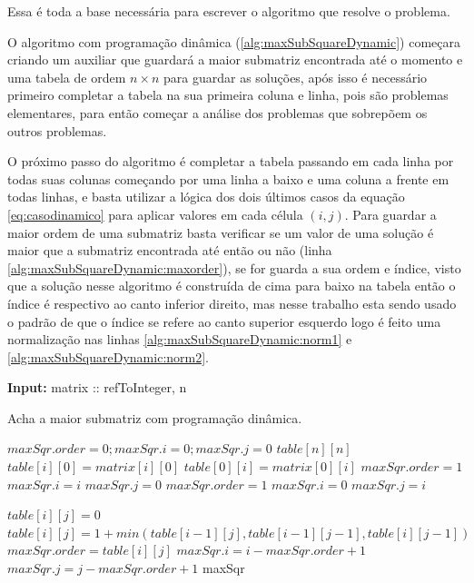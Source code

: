 \documentclass[10.9pt]{article}
\begin{document}
Essa é toda a base necessária para escrever o algoritmo que resolve o problema.

O algoritmo com programação dinâmica (\ref{alg:maxSubSquareDynamic}) começara criando um auxiliar que guardará a maior submatriz encontrada até o momento e uma tabela de ordem \(n\times n\) para guardar as soluções, após isso é necessário primeiro completar a tabela na sua primeira coluna e linha, pois são problemas elementares, para então começar a análise dos problemas que sobrepõem os outros problemas.

O próximo passo do algoritmo é completar a tabela passando em cada linha por todas suas colunas começando por uma linha a baixo e uma coluna a frente em todas linhas, e basta utilizar a lógica dos dois últimos casos da equação \eqref{eq:casodinamico} para aplicar valores em cada célula \((i,j)\). Para guardar a maior ordem de uma submatriz basta verificar se um valor de uma solução é maior que a submatriz encontrada até então ou não (linha \ref{alg:maxSubSquareDynamic:maxorder}), se for guarda a sua ordem e índice, visto que a solução nesse algoritmo é construída de cima para baixo na tabela então o índice é respectivo ao canto inferior direito, mas nesse trabalho esta sendo usado o padrão de que o índice se refere ao canto superior esquerdo logo é feito uma normalização nas linhas \ref{alg:maxSubSquareDynamic:norm1} e \ref{alg:maxSubSquareDynamic:norm2}.

\begin{algorithm}
\textbf{Input:} matrix :: refToInteger, n
\caption{Acha a maior submatriz com programação dinâmica.}\label{alg:maxSubSquareDynamic}
\begin{algorithmic}[1]
\State $maxSqr.order=0; maxSqr.i=0;maxSqr.j=0$
\State $table[n][n]$\label{alg:maxSubSquareDynamic:table}
\State $table[i][0] = matrix[i][0]$
\State $table[0][i] = matrix[0][i]$
    \State $maxSqr.order=1$
    \State $maxSqr.i=i$
    \State $maxSqr.j=0$
\EndIf
{}
    \State $maxSqr.order=1$
    \State $maxSqr.i=0$
    \State $maxSqr.j=i$
\EndIf
\EndFor

		    \State $table[i][j] = 0$
		\Else
		    \State $table[i][j] = 1+min(table[i-1][j],table[i-1][j-1],table[i][j-1])$
		    \label{alg:maxSubSquareDynamic:maxorder}
		    \State $maxSqr.order=table[i][j]$
		    \State $maxSqr.i=i-maxSqr.order+1$\label{alg:maxSubSquareDynamic:norm1}
		    \State $maxSqr.j=j-maxSqr.order+1$\label{alg:maxSubSquareDynamic:norm2}
		    \EndIf
		\EndIf
            \EndFor
	\EndFor
	\State \Return maxSqr
  \EndProcedure
\end{algorithmic}
\end{algorithm}
\end{document}
